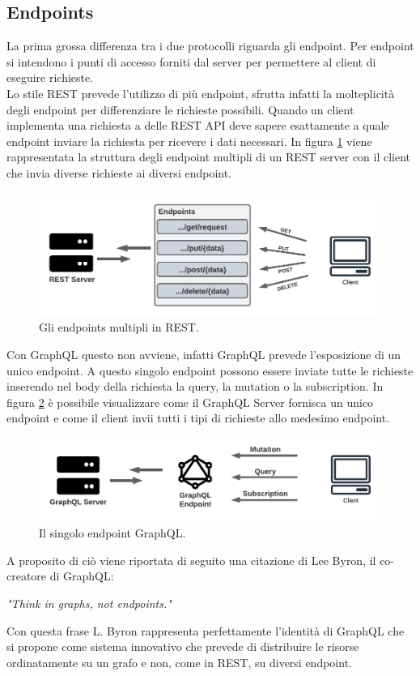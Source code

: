 \subsection{Endpoints}
La prima grossa differenza tra i due protocolli riguarda gli endpoint. Per endpoint si intendono i punti di accesso forniti dal server per permettere al client di eseguire richieste.\\
Lo stile REST prevede l'utilizzo di più endpoint, sfrutta infatti la molteplicità degli endpoint per differenziare le richieste possibili. Quando un client implementa una richiesta a delle REST API deve sapere esattamente a quale endpoint inviare la richiesta per ricevere i dati necessari. In figura \ref{REST-endpoints} viene rappresentata la struttura degli endpoint multipli di un REST server con il client che invia diverse richieste ai diversi endpoint.
\FloatBarrier
\begin{figure}[!ht]
\centering
\includegraphics[width=0.9\linewidth]{immagini/RESTEndpoints.pdf}
\caption{Gli endpoints multipli in REST.}
\label{REST-endpoints}
\end{figure}
\FloatBarrier
Con GraphQL questo non avviene, infatti GraphQL prevede l'esposizione di un unico endpoint. A questo singolo endpoint possono essere inviate tutte le richieste inserendo nel body della richiesta la query, la mutation o la subscription. In figura \ref{GraphQL-endpoint} è possibile visualizzare come il GraphQL Server fornisca un unico endpoint e come il client invii tutti i tipi di richieste allo medesimo endpoint.
\FloatBarrier
\begin{figure}[!ht]
\centering
\includegraphics[width=0.9\linewidth]{immagini/GraphQLEndpoint.pdf}
\caption{Il singolo endpoint GraphQL.}
\label{GraphQL-endpoint}
\end{figure}
\FloatBarrier
A proposito di ciò viene riportata di seguito una citazione di Lee Byron, il co-creatore di GraphQL:
\begin{quoting}
  \textit{"Think in graphs, not endpoints."}
\end{quoting}
Con questa frase L. Byron rappresenta perfettamente l'identità di GraphQL che si propone come sistema innovativo che prevede di distribuire le risorse ordinatamente su un grafo e non, come in REST, su diversi endpoint.
